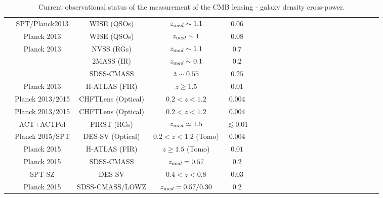 \begin{table}[!t]
\begin{tabular}{l@{\hspace{3pt}} *{22}{c}}
\citet{Geach2013} & SPT/Planck2013 & WISE (QSOs) & $z_{\rm med}\sim 1.1$ &  $0.06$\\%
\citet{DiPompeo2014} & Planck 2013 & WISE (QSOs) & $z_{\rm med} \sim 1$ &  $0.08$ \\%
\cite{Giannantonio2014} & Planck 2013 & NVSS (RGs) & $z_{\rm med} \sim 1.1$ &  $ 0.7$\\%
 &  & 2MASS (IR) & $z_{\rm med} \sim 0.1$ &  $ 0.2$ \\%
 &  & SDSS-CMASS & $\bar{z} \sim 0.55$ &  $ 0.25$ \\%

\citet{Bianchini2015}& Planck 2013 & H-ATLAS (FIR) & $z \geq 1.5$ &  $0.01$ \\%
\citet{Omori2015} & Planck 2013/2015 & CHFTLens (Optical) & $0.2 < z < 1.2$ &  $0.004$\\%
\citet{Kuntz2015} & Planck 2013/2015 & CHFTLens (Optical) & $0.2 < z < 1.2$ &  $0.004$\\%
\citet{Allison2015a}& ACT+ACTPol  & FIRST (RGs) & $z_{\rm med}\simeq 1.5$ &  $\lesssim0.01$ \\%
\citet{Giannantonio2016a} & Planck 2015/SPT & DES-SV (Optical) & $0.2 < z < 1.2$ (Tomo) &  $0.004$ \\%
\citet{Bianchini2016a} & Planck 2015 & H-ATLAS (FIR) & $z \geq 1.5$ (Tomo) &  $0.01$ \\%
\citet{Pullen2016} & Planck 2015 & SDSS-CMASS & $z_{\rm med} = 0.57 $ &  $0.2$ \\%
\citet{Baxter2016} & SPT-SZ & DES-SV & $0.4 <z < 0.8 $ &  $0.03$ \\%
\citet{Singh2016} & Planck 2015 & SDSS-CMASS/LOWZ & $z_{\rm med} = 0.57/0.30 $ &  $0.2$ \\%
\midrule
\bottomrule
\end{tabular}
\caption{Current observational status of the measurement of the \gls{CMB} lensing - galaxy density cross-power. }
\label{tab:historyxc}
\end{table}



